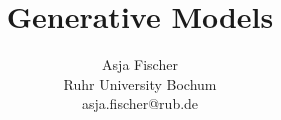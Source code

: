 \documentclass[11pt,mathserif]{beamer}
\title[]{Generative Models}
\author{
  Asja Fischer \\
  Ruhr University Bochum\\
  asja.fischer@rub.de 
}
\begin{document}
\frame{\titlepage}

%
%
%

\end{document}
